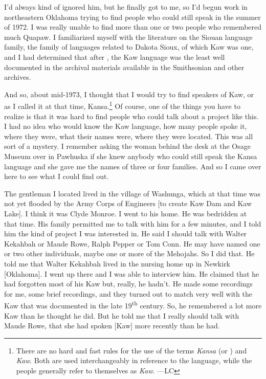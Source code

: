 \documentclass[output=paper]{LSP/langsci}
\begin{document}
I'd always kind of ignored him, but he finally got to me, so I'd begun work in northeastern Oklahoma trying to find people who could still speak  in the summer of 1972. I was really unable to find more than one or two people who remembered much Quapaw. I familiarized myself with the literature on the Siouan language family, the family of languages related to Dakota Sioux, of which Kaw was one, and I had determined that after , the Kaw language was the least well documented in the archival materials available in the Smithsonian and other archives. 

 
And so, about mid-1973, I thought that I would try to find speakers of Kaw, or as I called it at that time, Kansa.\footnote{There are no hard and fast rules for the use of the terms \textit{Kansa} (or \textit{}) and \textit{Kaw}. Both are used interchangeably in reference to the language, while the people generally refer to themselves as \textit{Kaw}. ---LC} Of course, one of the things you have to realize is that it was hard to find people who could talk about a project like this. I had no idea who would know the Kaw language, how many people spoke it, where they were, what their names were, where they were located. This was all sort of a mystery. I remember asking the woman behind the desk at the Osage Museum over in Pawhuska if she knew anybody who could still speak the Kansa language and she gave me the names of three or four families. And so I came over here to see what I could find out. 
 

The gentleman I located lived in the village of Washunga, which at that time was not yet flooded by the Army Corps of Engineers [to create Kaw Dam and Kaw Lake]. I think it was Clyde Monroe. I went to his home. He was bedridden at that time. His family permitted me to talk with him for a few minutes, and I told him the kind of project I was interested in. He said I should talk with Walter Kekahbah or Maude Rowe, Ralph Pepper or Tom Conn. He may have named one or two other individuals, maybe one or more of the Mehojahs. So I did that. He told me that Walter Kekahbah lived in the nursing home up in Newkirk [Oklahoma]. I went up there and I was able to interview him. He claimed that he had forgotten most of his Kaw but, really, he hadn't. He made some recordings for me, some brief recordings, and they turned out to match very well with the Kaw that was documented in the late 19\textsuperscript{th} century. So, he remembered a lot more Kaw than he thought he did. But he told me that I really should talk with Maude Rowe, that she had spoken [Kaw] more recently than he had. 
\end{document}
